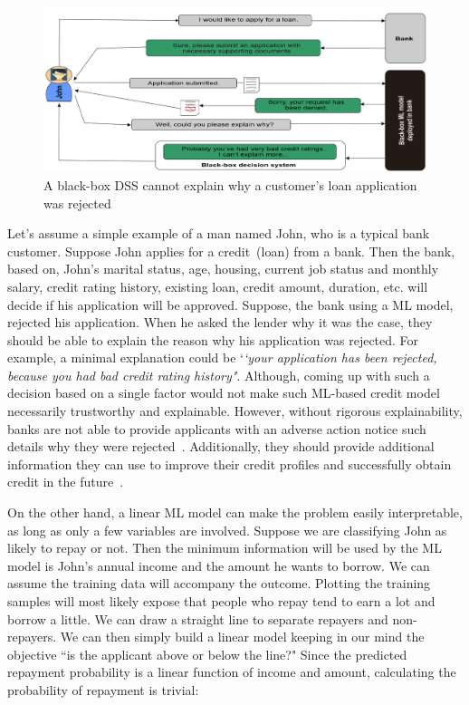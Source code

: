 \vspace{-2mm}
\begin{figure}[h]
	\centering
	\includegraphics[scale=0.7]{images/loan.png}
	\caption{A black-box DSS cannot explain why a customer's loan application was rejected}
    \label{fig:model_bbm1}
    \vspace{-2mm}
\end{figure}

\hspace*{3.5mm} Let's assume a simple example of a man named John, who is a typical bank customer. Suppose John applies for a credit~(loan) from a bank.
Then the bank, based on, John's marital status, age, housing, current job status and monthly salary, credit rating history, existing loan, credit amount, duration, etc. will decide if his application will be approved. Suppose, the bank using a ML model, rejected his application. When he asked the lender why it was the case, they should be able to explain the reason why his application was rejected. For example, a minimal explanation could be `\textit{`your application has been rejected, because you had bad credit rating history"}. Although, coming up with such a decision based on a single factor would not make such ML-based credit model necessarily trustworthy and explainable.
However, without rigorous explainability, banks are not able to provide applicants with an adverse action notice such details why they were rejected~\cite{hall2020responsible}. Additionally, they should provide additional information they can use to improve their credit profiles and successfully obtain credit in the future~\cite{hall2020responsible}. 

\hspace*{3.5mm} On the other hand, a linear ML model can make the problem easily interpretable, as long as only a few variables are involved. Suppose we are classifying John as likely to repay or not. Then the minimum information will be used by the ML model is John's annual income and the amount he wants to borrow. We can assume the training data will accompany the outcome. Plotting the training samples will most likely expose that people who repay tend to earn a lot and borrow a little. We can draw a straight line to separate repayers and non-repayers. We can then simply build a linear model keeping in our mind the objective ``is the applicant above or below the line?" Since the predicted repayment probability is a linear function of income and amount, calculating the probability of repayment is trivial: 

